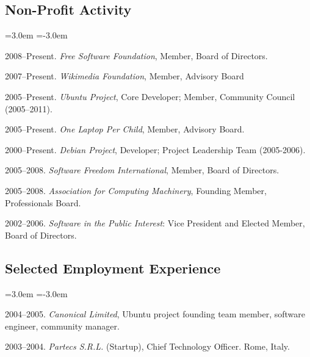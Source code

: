 \documentclass[10pt]{article}
\newenvironment{cvlist}{
\begin{list}{}{\leftmargin=3.0em \itemindent=-3.0em}
  \setlength{\itemsep}{0pt}
  \setlength{\parskip}{0em}
  \setlength{\parsep}{1em}
  \setlength{\parindent}{0em}}
{\vspace{1em}
\end{list}}
\begin{document}
\subsection{Non-Profit Activity}
\begin{cvlist}
\item 2008--Present. \emph{Free Software Foundation}, Member, Board of Directors.
\item 2007--Present. \emph{Wikimedia Foundation}, Member, Advisory Board
\item 2005--Present. \emph{Ubuntu Project}, Core Developer; Member, Community Council (2005--2011).
\item 2005--Present. \emph{One Laptop Per Child}, Member, Advisory Board.
\item 2000--Present. \emph{Debian Project}, Developer; Project Leadership Team (2005-2006).
\item 2005--2008. \emph{Software Freedom International}, Member, Board of Directors.
\item 2005--2008. \emph{Association for Computing Machinery}, Founding Member, Professionals Board.
\item 2002--2006. \emph{Software in the Public Interest}: Vice President and Elected Member, Board of Directors.
\end{cvlist}

\subsection{Selected Employment Experience}
\begin{cvlist}
\item 2004--2005. \emph{Canonical Limited}, Ubuntu project founding team member, software engineer, community manager.
\item 2003--2004. \emph{Partecs S.R.L.} (Startup), Chief Technology Officer. Rome, Italy.
\end{cvlist}
\end{document}
